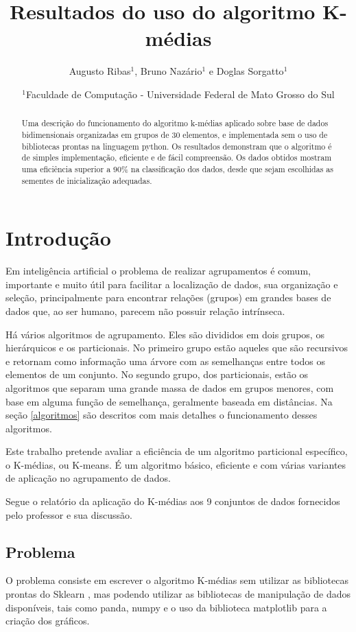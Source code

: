 \documentclass[12pt, a4paper]{article}
\title{Resultados do uso do algoritmo K-médias}
\author{Augusto Ribas$^1$, Bruno Nazário$^1$ e Doglas Sorgatto$^1$}
\date{$^1$Faculdade de Computação - Universidade Federal de Mato Grosso do Sul}
\begin{document}
\maketitle

\begin{abstract}
Uma descrição do funcionamento do algoritmo k-médias aplicado sobre base de dados bidimensionais organizadas em grupos de 30 elementos, e implementada sem o uso de bibliotecas prontas na linguagem python. Os resultados demonstram que o algoritmo é de simples implementação, eficiente e de fácil compreensão. Os dados obtidos mostram uma eficiência superior a 90\% na classificação dos dados, desde que sejam escolhidas as sementes de inicialização adequadas.
\end{abstract}
%
\section{Introdução}
Em inteligência artificial o problema de realizar agrupamentos é comum, importante e muito útil para facilitar a localização de dados, sua organização e seleção, principalmente para encontrar relações (grupos) em grandes bases de dados que, ao ser humano, parecem não possuir relação intrínseca.

Há vários algoritmos de agrupamento. Eles são divididos em dois grupos, os hierárquicos e os particionais. No primeiro grupo estão aqueles que são recursivos e retornam como informação uma árvore com as semelhanças entre todos os elementos de um conjunto. No segundo grupo, dos particionais, estão os algoritmos que separam uma grande massa de dados em grupos menores, com base em alguma função de semelhança, geralmente baseada em distâncias. Na seção \ref{algoritmos} são descritos com mais detalhes o funcionamento desses algoritmos.

Este trabalho pretende avaliar a eficiência de um algoritmo particional específico, o K-médias, ou K-means. É um algoritmo básico, eficiente e com várias variantes de aplicação no agrupamento de dados.

Segue o relatório da aplicação do K-médias aos 9 conjuntos de dados fornecidos pelo professor e sua discussão.


\subsection{Problema}
O problema consiste em escrever o algoritmo K-médias sem utilizar as bibliotecas prontas do Sklearn \citep{scikit-learn}, mas podendo utilizar as bibliotecas de manipulação de dados disponíveis, tais como panda, numpy e o uso da biblioteca matplotlib para a criação dos gráficos.
\end{document}
